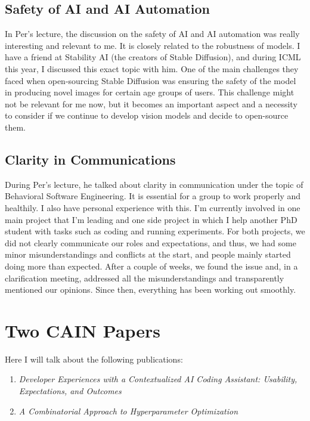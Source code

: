 \documentclass[11pt]{article}
\begin{document}
\subsection{Safety of AI and AI Automation}
In Per's lecture, the discussion on the safety of AI and AI automation was really interesting and relevant to me. It is closely related to the robustness of models. I have a friend at Stability AI (the creators of Stable Diffusion), and during ICML this year, I discussed this exact topic with him. One of the main challenges they faced when open-sourcing Stable Diffusion was ensuring the safety of the model in producing novel images for certain age groups of users. This challenge might not be relevant for me now, but it becomes an important aspect and a necessity to consider if we continue to develop vision models and decide to open-source them.

\subsection{Clarity in Communications}
During Per's lecture, he talked about clarity in communication under the topic of Behavioral Software Engineering. It is essential for a group to work properly and healthily. I also have personal experience with this. I'm currently involved in one main project that I'm leading and one side project in which I help another PhD student with tasks such as coding and running experiments. For both projects, we did not clearly communicate our roles and expectations, and thus, we had some minor misunderstandings and conflicts at the start, and people mainly started doing more than expected. After a couple of weeks, we found the issue and, in a clarification meeting, addressed all the misunderstandings and transparently mentioned our opinions. Since then, everything has been working out smoothly.

\section{Two CAIN Papers}

Here I will talk about the following publications:
\begin{enumerate}
    \item \textit{Developer Experiences with a Contextualized AI Coding Assistant: Usability, Expectations, and Outcomes} \citep{pinto2024developer}
    \item \textit{A Combinatorial Approach to Hyperparameter Optimization} \cite{khadka2024combinatorial}
\end{enumerate}
\end{document}
